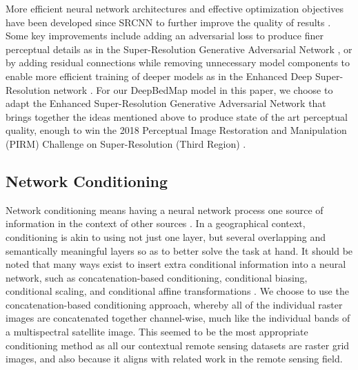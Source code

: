 \documentclass[tc, manuscript]{copernicus}
\begin{document}
More efficient neural network architectures and effective optimization objectives have been developed since SRCNN to further improve the quality of results \cite[see][for a review]{YangDeepLearningSingle2018}.
Some key improvements include adding an adversarial loss \citep{GoodfellowGenerativeAdversarialNetworks2014} to produce finer perceptual details as in the Super-Resolution Generative Adversarial Network \citep[SRGAN,][]{LedigPhotoRealisticSingleImage2016}, or by adding residual connections while removing unnecessary model components to enable more efficient training of deeper models as in the Enhanced Deep Super-Resolution network \citep[EDSR,][]{LimEnhancedDeepResidual2017}.
For our DeepBedMap model in this paper, we choose to adapt the Enhanced Super-Resolution Generative Adversarial Network \citep[ESRGAN,][]{WangESRGANEnhancedSuperResolution2018} that brings together the ideas mentioned above to produce state of the art perceptual quality, enough to win the 2018 Perceptual Image Restoration and Manipulation (PIRM) Challenge on Super-Resolution (Third Region) \citep{Blau2018PIRMChallenge2018}.

\subsection{Network Conditioning}

Network conditioning means having a neural network process one source of information in the context of other sources \citep{DumoulinFeaturewisetransformations2018}.
In a geographical context, conditioning is akin to using not just one layer, but several overlapping and semantically meaningful layers so as to better solve the task at hand.
It should be noted that many ways exist to insert extra conditional information into a neural network, such as concatenation-based conditioning, conditional biasing, conditional scaling, and conditional affine transformations \citep{DumoulinFeaturewisetransformations2018}.
We choose to use the concatenation-based conditioning approach, whereby all of the individual raster images are concatenated together channel-wise, much like the individual bands of a multispectral satellite image.
This seemed to be the most appropriate conditioning method as all our contextual remote sensing datasets are raster grid images, and also because it aligns with related work in the remote sensing field.
\end{document}
